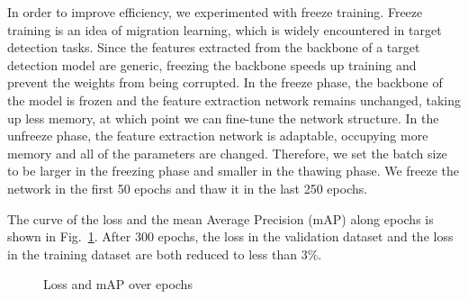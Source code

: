 In order to improve efficiency, we experimented with freeze training. Freeze training is an idea of migration learning, which is widely encountered in target detection tasks. Since the features extracted from the backbone of a target detection model are generic, freezing the backbone speeds up training and prevent the weights from being corrupted. In the freeze phase, the backbone of the model is frozen and the feature extraction network remains unchanged, taking up less memory, at which point we can fine-tune the network structure. In the unfreeze phase, the feature extraction network is adaptable, occupying more memory and all of the parameters are changed. Therefore, we set the batch size to be larger in the freezing phase and smaller in the thawing phase. We freeze the network in the first 50 epochs and thaw it in the last 250 epochs.

The curve of the loss and the mean Average Precision (mAP) along epochs is shown in Fig.~\ref{fig:Loss and mAP}. After 300 epochs, the loss in the validation dataset and the loss in the training dataset are both reduced to less than 3\%.

\begin{figure}[htb]
    \centering
    \caption{Loss and mAP over epochs}
    \label{fig:Loss and mAP}
\end{figure}
